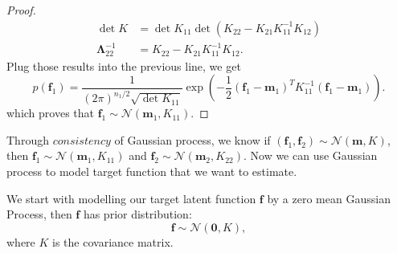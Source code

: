 \documentclass[11pt,a4paper]{article}
\theoremstyle{definition}
\numberwithin{equation}{section}
\let\vec\mathbf
\begin{document}
\begin{proof}
\begin{equation*}
\begin{split}
		\det K&= \det K_{11}\det(K_{22}-K_{21}K_{11}^{-1}K_{12})\\
		\vec \Lambda_{22}^{-1} &= K_{22}-K_{21}K_{11}^{-1}K_{12}.
		\end{split}
		\end{equation*}
		Plug those results into the previous line, we get
		\begin{equation*} \label{}
		p(\vec f_1) = \frac{1}{(2\pi)^{n_1/2}\sqrt{\det K_{11}}} \exp{\left(-\frac{1}{2}\left(\vec f_1 - \vec m_1\right)^TK_{11}^{-1}\left(\vec f_1 - \vec m _1 \right)\right)}.
		\end{equation*}
		which proves that $\vec f_1\sim\mathcal{N}(\vec m_1,K_{11})$.
	\end{proof}
	
	Through $consistency$ of Gaussian process, we know if $\left(\vec f_1, \vec f_2\right)\sim \mathcal N \left(\vec m , K \right)$, then $\vec f_1 \sim   \mathcal N \left(\vec m_1 , K_{11} \right)$ and $ \vec f_2 \sim  \mathcal N \left(\vec m_2 , K_{22} \right)$. Now we can use Gaussian process to model target function that we want to estimate.
	
	We start with modelling our target latent function $\vec f$ by a zero mean Gaussian Process, then $\vec f$ has prior distribution:
	\begin{equation} \label{noise-free}
	\vec f \sim \mathcal{N}(\vec 0, K),
	\end{equation}
	where $K$ is the covariance matrix.
	
\end{document}
